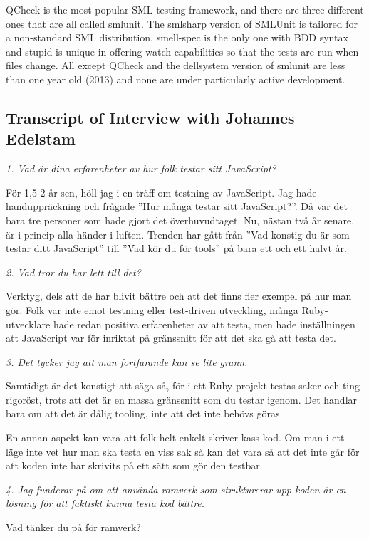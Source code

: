 \documentclass[11pt]{article}
\begin{document}
QCheck is the most popular SML testing framework, and there are three different ones that are all called smlunit. The smlsharp version of SMLUnit is tailored for a non-standard SML distribution, smell-spec is the only one with BDD syntax and stupid is unique in offering watch capabilities so that the tests are run when files change. All except QCheck and the dellsystem version of smlunit are less than one year old (2013) and none are under particularly active development.

\subsection*{Transcript of Interview with Johannes Edelstam}

\emph{1. Vad är dina erfarenheter av hur folk testar sitt JavaScript?}

För 1,5-2 år sen, höll jag i en träff om testning av JavaScript. Jag hade handuppräckning och frågade ”Hur många testar sitt JavaScript?”. Då var det bara tre personer som hade gjort det överhuvudtaget. Nu, nästan två år senare, är i princip alla händer i luften. Trenden har gått från ”Vad konstig du är som testar ditt JavaScript” till ”Vad kör du för tools” på bara ett och ett halvt år.

\emph{2. Vad tror du har lett till det?}

Verktyg, dels att de har blivit bättre och att det finns fler exempel på hur man gör. Folk var inte emot testning eller test-driven utveckling, många Ruby-utvecklare hade redan positiva erfarenheter av att testa, men hade inställningen att JavaScript var för inriktat på gränssnitt för att det ska gå att testa det.

\emph{3. Det tycker jag att man fortfarande kan se lite grann.}

Samtidigt är det konstigt att säga så, för i ett Ruby-projekt testas saker och ting rigoröst, trots att det är en massa gränssnitt som du testar igenom. Det handlar bara om att det är dålig tooling, inte att det inte behövs göras.

En annan aspekt kan vara att folk helt enkelt skriver kass kod. Om man i ett läge inte vet hur man ska testa en viss sak så kan det vara så att det inte går för att koden inte har skrivits på ett sätt som gör den testbar.

\emph{4. Jag funderar på om att använda ramverk som strukturerar upp koden är en lösning för att faktiskt kunna testa kod bättre.}

Vad tänker du på för ramverk?
\end{document}
